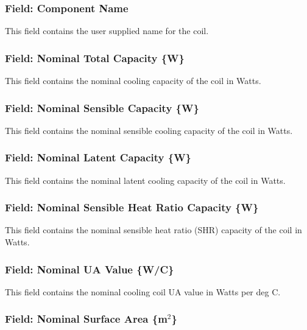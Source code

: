 \subsubsection{Field: Component Name}\label{field-component-name-2}

This field contains the user supplied name for the coil.

\subsubsection{Field: Nominal Total Capacity \{W\}}\label{field-nominal-total-capacity-w-1}

This field contains the nominal cooling capacity of the coil in Watts.

\subsubsection{Field: Nominal Sensible Capacity \{W\}}\label{field-nominal-sensible-capacity-w}

This field contains the nominal sensible cooling capacity of the coil in Watts.

\subsubsection{Field: Nominal Latent Capacity \{W\}}\label{field-nominal-latent-capacity-w}

This field contains the nominal latent cooling capacity of the coil in Watts.

\subsubsection{Field: Nominal Sensible Heat Ratio Capacity \{W\}}\label{field-nominal-sensible-heat-ratio-capacity-w}

This field contains the nominal sensible heat ratio (SHR) capacity of the coil in Watts.

\subsubsection{Field: Nominal UA Value \{W/C\}}\label{field-nominal-ua-value-wc}

This field contains the nominal cooling coil UA value in Watts per deg C.

\subsubsection{\texorpdfstring{Field: Nominal Surface Area \{m\(^{2}\)\}}{Field: Nominal Surface Area \{m\^{}\{2\}\}}}\label{field-nominal-surface-area-m2}


